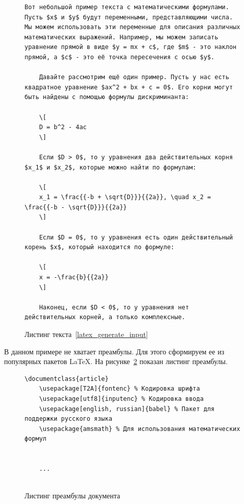 \begin{figure}
    \begin{lstlisting}[language={[LaTeX]Tex}]
    Вот небольшой пример текста с математическими формулами. Пусть $x$ и $y$ будут переменными, представляющими числа. Мы можем использовать эти переменные для описания различных математических выражений. Например, мы можем записать уравнение прямой в виде $y = mx + c$, где $m$ - это наклон прямой, а $c$ - это её точка пересечения с осью $y$.
            
    Давайте рассмотрим ещё один пример. Пусть у нас есть квадратное уравнение $ax^2 + bx + c = 0$. Его корни могут быть найдены с помощью формулы дискриминанта:
        
    \[
    D = b^2 - 4ac
    \]
        
    Если $D > 0$, то у уравнения два действительных корня $x_1$ и $x_2$, которые можно найти по формулам:
        
    \[
    x_1 = \frac{{-b + \sqrt{D}}}{{2a}}, \quad x_2 = \frac{{-b - \sqrt{D}}}{{2a}}
    \]
        
    Если $D = 0$, то у уравнения есть один действительный корень $x$, который находится по формуле:
        
    \[
    x = -\frac{b}{{2a}}
    \]
        
    Наконец, если $D < 0$, то у уравнения нет действительных корней, а только комплексные.
    \end{lstlisting}
    \caption{Листинг текста~\ref{latex_generate_input}}
    \label{latex_code}
\end{figure}

В данном примере не хватает преамбулы. Для этого сформируем ее из популярных пакетов \LaTeX. На рисунке~\ref{preambula} показан листинг преамбулы.

\begin{figure}
    \begin{lstlisting}[language={[LaTeX]Tex}]
    \documentclass{article}
    \usepackage[T2A]{fontenc} % Кодировка шрифта
    \usepackage[utf8]{inputenc} % Кодировка ввода
    \usepackage[english, russian]{babel} % Пакет для поддержки русского языка
    \usepackage{amsmath} % Для использования математических формул
    
    
    ...
    
    \end{lstlisting}
    \caption{Листинг преамбулы документа}
    \label{preambula}
\end{figure}